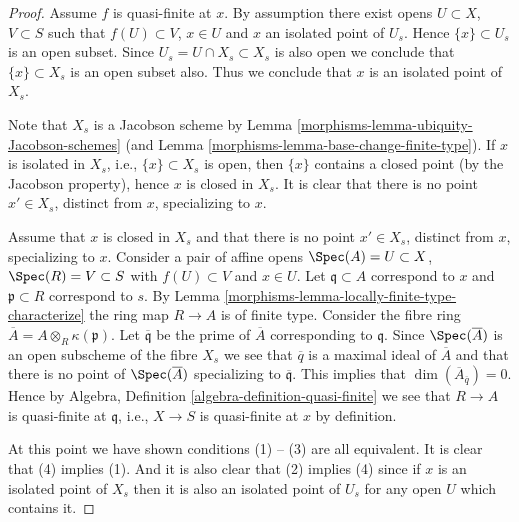 \begin{proof}

Assume $f$ is quasi-finite at $x$. By assumption there exist opens
$U \subset X$, $V \subset S$ such that $f(U) \subset V$, $x \in U$
and $x$ an isolated point of $U_s$. Hence $\{x\} \subset U_s$ is an open
subset. Since $U_s = U \cap X_s \subset X_s$ is also open we conclude
that $\{x\} \subset X_s$ is an open subset also. Thus we conclude
that $x$ is an isolated point of $X_s$.

\medskip\noindent
Note that $X_s$ is a Jacobson scheme by
Lemma \ref{morphisms-lemma-ubiquity-Jacobson-schemes}
(and
Lemma \ref{morphisms-lemma-base-change-finite-type}).
If $x$ is isolated in $X_s$, i.e., $\{x\} \subset X_s$ is open,
then $\{x\}$ contains a closed point (by the Jacobson property), hence
$x$ is closed in $X_s$. It is clear that there is no point $x' \in X_s$,
distinct from $x$, specializing to $x$.

\medskip\noindent
Assume that $x$ is closed in $X_s$ and that there is no point $x' \in X_s$,
distinct from $x$, specializing to $x$. Consider a pair of affine opens
$\Spec(A) = U \subset X$, $\Spec(R) = V \subset S$ with
$f(U) \subset V$ and $x \in U$. Let $\mathfrak q \subset A$ correspond to
$x$ and $\mathfrak p \subset R$ correspond to $s$.
By Lemma \ref{morphisms-lemma-locally-finite-type-characterize} the ring map
$R \to A$ is of finite type. Consider the fibre ring
$\overline{A} = A \otimes_R \kappa(\mathfrak p)$.
Let $\overline{\mathfrak q}$ be the prime of $\overline{A}$ corresponding
to $\mathfrak q$. Since $\Spec(\overline{A})$ is an open subscheme of
the fibre $X_s$ we see that $\overline{q}$ is a maximal ideal
of $\overline{A}$ and that there is no point of $\Spec(\overline{A})$
specializing to $\overline{\mathfrak q}$.
This implies that $\dim(\overline{A}_{\overline{q}}) = 0$.
Hence by
Algebra, Definition \ref{algebra-definition-quasi-finite}
we see that $R \to A$ is quasi-finite at $\mathfrak q$, i.e.,
$X \to S$ is quasi-finite at $x$ by definition.

\medskip\noindent
At this point we have shown conditions (1) -- (3) are all equivalent.
It is clear that (4) implies (1). And it is also clear that
(2) implies (4) since if $x$ is an isolated point of $X_s$
then it is also an isolated point of $U_s$ for any open $U$
which contains it.
\end{proof}

